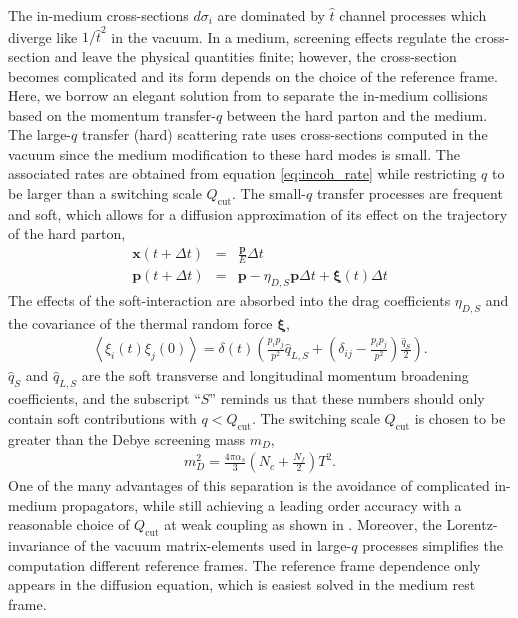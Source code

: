 \documentclass[aps, prc, reprint, amsmath, groupedaddress, nofootinbib]{revtex4-1}
\begin{document}
The in-medium cross-sections $d\sigma_i$ are dominated by $\hat{t}$ channel processes which diverge like $1/\hat{t}^2$ in the vacuum.
In a medium, screening effects regulate the cross-section and leave the physical quantities finite; however, the cross-section becomes complicated and its form depends on the choice of the reference frame.
Here, we borrow an elegant solution from \cite{Ghiglieri:2015ala} to separate the in-medium collisions based on the momentum transfer-$q$ between the hard parton and the medium.
The large-$q$ transfer (hard) scattering rate uses cross-sections computed in the vacuum since the medium modification to these hard modes is small.
The associated rates are obtained from equation \ref{eq:incoh_rate} while restricting $q$ to be larger than a switching scale $Q_{\textrm{cut}}$.
The small-$q$ transfer processes are frequent and soft, which allows for a diffusion approximation of its effect on the trajectory of the hard parton,
\begin{eqnarray}
\mathbf{x}(t+\Delta t) &=& \frac{\mathbf{p}}{E}\Delta t\\
\mathbf{p}(t+\Delta t) &=& \mathbf{p} - \eta_{D,S} \mathbf{p} \Delta t + \mathbf{\xi}(t) \Delta t
\end{eqnarray}
The effects of the soft-interaction are absorbed into the drag coefficients $\eta_{D,S}$ and the covariance of the thermal random force $\mathbf{\xi}$,
\begin{eqnarray}
\left\langle\xi_i(t)\xi_j(0)\right\rangle = \delta(t) \left(
\frac{p_i p_j}{p^2}\hat{q}_{L,S} + \left(
\delta_{ij}-\frac{p_i p_j}{p^2}
\right)\frac{\hat{q}_S}{2} 
\right).
\end{eqnarray}
$\hat{q}_S$ and $\hat{q}_{L,S}$ are the soft transverse and longitudinal momentum broadening coefficients, and the subscript ``$S$'' reminds us that these numbers should only contain soft contributions with $q<Q_{\textrm{cut}}$.
The switching scale $Q_{\textrm{cut}}$ is chosen to be greater than the Debye screening mass $m_D$,
\begin{eqnarray}
m_D^2 = \frac{4\pi \alpha_s}{3}\left(N_c+\frac{N_f}{2}\right) T^2.
\end{eqnarray}
One of the many advantages of this separation is the avoidance of complicated in-medium propagators, while still achieving a leading order accuracy with a reasonable choice of $Q_{\textrm{cut}}$ at weak coupling as shown in \cite{Ghiglieri:2015ala}.
Moreover, the Lorentz-invariance of the vacuum matrix-elements used in large-$q$ processes simplifies the computation different reference frames. The reference frame dependence only appears in the diffusion equation, which is easiest solved in the medium rest frame.
\end{document}
